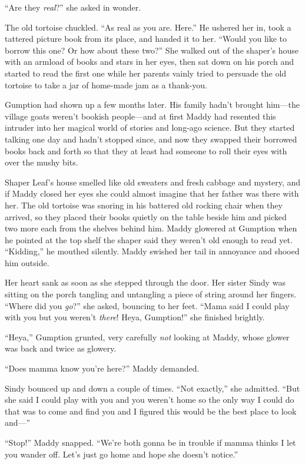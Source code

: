 \documentclass[10pt]{article}
\begin{document}
``Are they \emph{real}?'' she asked in wonder.

The old tortoise chuckled. ``As real as you are. Here.'' He ushered her
in, took a tattered picture book from its place, and handed it to her.
``Would you like to borrow this one? Or how about these two?'' She
walked out of the shaper's house with an armload of books and stars in
her eyes, then sat down on his porch and started to read the first one
while her parents vainly tried to persuade the old tortoise to take a
jar of home-made jam as a thank-you.

Gumption had shown up a few months later. His family hadn't brought
him---the village goats weren't bookish people---and at first Maddy had
resented this intruder into her magical world of stories and long-ago
science. But they started talking one day and hadn't stopped since, and
now they swapped their borrowed books back and forth so that they at
least had someone to roll their eyes with over the mushy bits.

Shaper Leaf's house smelled like old sweaters and fresh cabbage and
mystery, and if Maddy closed her eyes she could almost imagine that her
father was there with her. The old tortoise was snoring in his battered
old rocking chair when they arrived, so they placed their books quietly
on the table beside him and picked two more each from the shelves behind
him. Maddy glowered at Gumption when he pointed at the top shelf the
shaper said they weren't old enough to read yet. ``Kidding,'' he mouthed
silently. Maddy swished her tail in annoyance and shooed him outside.

Her heart sank as soon as she stepped through the door. Her sister Sindy
was sitting on the porch tangling and untangling a piece of string
around her fingers. ``Where did you \emph{go}?'' she asked, bouncing to
her feet. ``Mama said I could play with you but you weren't
\emph{there}! Heya, Gumption!'' she finished brightly.

``Heya,'' Gumption grunted, very carefully \emph{not} looking at Maddy,
whose glower was back and twice as glowery.

``Does mamma know you're here?'' Maddy demanded.

Sindy bounced up and down a couple of times. ``Not exactly,'' she
admitted. ``But she said I could play with you and you weren't home so
the only way I could do that was to come and find you and I figured this
would be the best place to look and---''

``Stop!'' Maddy snapped. ``We're both gonna be in trouble if mamma
thinks I let you wander off. Let's just go home and hope she doesn't
notice.''
\end{document}
